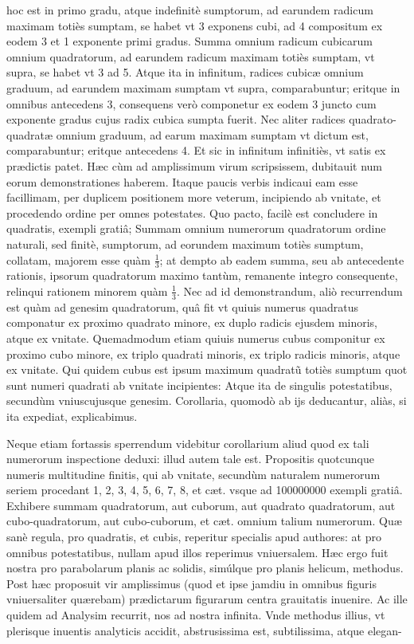 \documentclass[11pt,a4paper]{article}
\begin{document}
hoc est in primo gradu, atque indefinitè sumptorum, ad earundem radicum maximam totiès sumptam, se habet vt 3 exponens cubi, ad 4 compositum ex eodem 3 et 1 exponente primi gradus. Summa omnium radicum cubicarum omnium quadratorum, ad earundem radicum maximam totiès sumptam, vt supra, se habet vt 3 ad 5. Atque ita in infinitum, radices cubicæ omnium graduum, ad earundem maximam sumptam vt supra, comparabuntur; eritque in omnibus antecedens 3, consequens verò componetur ex eodem 3 juncto cum exponente gradus cujus radix cubica sumpta fuerit. Nec aliter radices quadrato-quadratæ omnium graduum, ad earum maximam sumptam vt dictum est, comparabuntur; eritque antecedens 4. Et sic in infinitum infinitiès, vt satis ex prædictis patet. Hæc cùm ad amplissimum virum scripsissem, dubitauit num eorum demonstrationes haberem. Itaque paucis verbis indicaui eam esse facillimam, per duplicem positionem more veterum, incipiendo ab vnitate, et procedendo ordine per omnes potestates. Quo pacto, facilè est concludere in quadratis, exempli gratiâ; Summam omnium numerorum quadratorum ordine naturali, sed finitè, sumptorum, ad eorundem maximum totiès sumptum, collatam, majorem esse quàm $\frac13$; at dempto ab eadem summa, seu ab antecedente rationis, ipsorum quadratorum maximo tantùm, remanente integro consequente, relinqui rationem minorem quàm $\frac13$. Nec ad id demonstrandum, aliò recurrendum est quàm ad genesim quadratorum, quâ fit vt quiuis numerus quadratus componatur ex proximo quadrato minore, ex duplo radicis ejusdem minoris, atque ex vnitate. Quemadmodum etiam quiuis numerus cubus componitur ex proximo cubo minore, ex triplo quadrati minoris, ex triplo radicis minoris, atque ex vnitate. Qui quidem cubus est ipsum maximum quadratũ totiès sumptum quot sunt numeri quadrati ab vnitate incipientes: Atque ita de singulis potestatibus, secundùm vniuscujusque genesim. Corollaria, quomodò ab ijs deducantur, aliàs, si ita expediat, explicabimus.

Neque etiam fortassis sperrendum videbitur corollarium aliud quod ex tali numerorum inspectione deduxi: illud autem tale est. Propositis quotcunque numeris multitudine finitis, qui ab vnitate, secundùm naturalem numerorum seriem procedant 1, 2, 3, 4, 5, 6, 7, 8, et cæt. vsque ad 100000000 exempli gratiâ. Exhibere summam quadratorum, aut cuborum, aut quadrato quadratorum, aut cubo-quadratorum, aut cubo-cuborum, et cæt. omnium talium numerorum. Quæ sanè regula, pro quadratis, et cubis, reperitur specialis apud authores: at pro omnibus potestatibus, nullam apud illos reperimus vniuersalem. Hæc ergo fuit nostra pro parabolarum planis ac solidis, simúlque pro planis helicum, methodus. Post hæc proposuit vir amplissimus (quod et ipse jamdiu in omnibus figuris vniuersaliter quærebam) prædictarum figurarum centra grauitatis inuenire. Ac ille quidem ad Analysim recurrit, nos ad nostra infinita. Vnde methodus illius, vt plerisque inuentis analyticis accidit, abstrusissima est, subtilissima, atque elegan-
\end{document}
